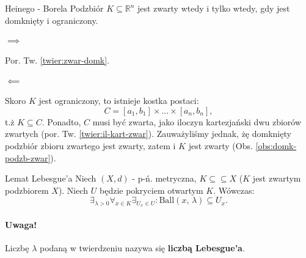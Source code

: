 \documentclass{article}
\numberwithin{defi}{section}
\numberwithin{defi}{section}
\newcommand{\R}{\mathbb{R}}
\newcommand{\se}{\subseteq}
\newcommand{\ball}[2]{\text{Ball}(#1, \, #2)}
\begin{document}
    
\begin{twier}{Heinego - Borela}
    Podzbiór $K \se \R ^n $ jest zwarty wtedy i tylko wtedy, gdy jest domknięty i ograniczony.
\end{twier}
\begin{dow}
    \paragraph{$\implies$} Por. Tw. \ref{twier:zwar-domk}.
    \paragraph{$\impliedby$} Skoro $K$ jest ograniczony, to istnieje kostka postaci:\begin{equation}
        C = [a_1, b_1] \times ... \times [a_n, b_n],
    \end{equation} t.ż $K \se C$. Ponadto, $C$ musi być zwarta, jako iloczyn kartezjański dwu zbiorów zwartych (por. Tw. \ref{twier:il-kart-zwar}). Zauważyliśmy jednak, żę domknięty podzbiór zbioru zwartego jest zwarty, zatem i $K$ jest zwarty (Obs. \ref{obs:domk-podzb-zwar}).
\end{dow}

\begin{twier}{Lemat Lebesgue'a}
    Niech $(X, d)$ - p-ń. metryczna, $K \se \se X$ ($K$ jest zwartym podzbiorem $X$). Niech $U$ będzie pokryciem otwartym $K$. Wówczas: \begin{equation}
        \exists_{\lambda > 0} \forall_{x \in K} \exists_{U_x \in U}: \ball{x}{\lambda} \subseteq U_x.
    \end{equation}
\end{twier}
    \paragraph{Uwaga!} Liczbę $\lambda$ podaną w twierdzeniu nazywa się \textbf{liczbą Lebesgue'a}.
\end{document}
